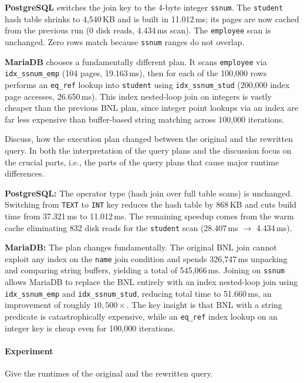 \documentclass[11pt]{scrartcl}
\begin{document}
\textbf{PostgreSQL} switches the join key to the 4-byte integer \texttt{ssnum}. The \texttt{student} hash table shrinks to 4,540\,KB and is built in 11.012\,ms; its pages are now cached from the previous run (0 disk reads, 4.434\,ms scan). The \texttt{employee} scan is unchanged. Zero rows match because \texttt{ssnum} ranges do not overlap.

\textbf{MariaDB} chooses a fundamentally different plan. It scans \texttt{employee} via \texttt{idx\_ssnum\_emp} (104 pages, 19.163\,ms), then for each of the 100,000 rows performs an \texttt{eq\_ref} lookup into \texttt{student} using \texttt{idx\_ssnum\_stud} (200,000 index page accesses, 26.650\,ms). This index nested-loop join on integers is vastly cheaper than the previous BNL plan, since integer point lookups via an index are far less expensive than buffer-based string matching across 100,000 iterations.

Discuss, how the execution plan changed between the original and the rewritten query. In both the interpretation of the query plans and the discussion focus on the crucial parts, i.e., the parts of the query plans that cause major runtime differences.

\textbf{PostgreSQL:} The operator type (hash join over full table scans) is unchanged. Switching from \texttt{TEXT} to \texttt{INT} key reduces the hash table by 868\,KB and cuts build time from 37.321\,ms to 11.012\,ms. The remaining speedup comes from the warm cache eliminating 832 disk reads for the \texttt{student} scan (28.407\,ms $\to$ 4.434\,ms).

\textbf{MariaDB:} The plan changes fundamentally. The original BNL join cannot exploit any index on the \texttt{name} join condition and spends 326,747\,ms unpacking and comparing string buffers, yielding a total of 545,066\,ms. Joining on \texttt{ssnum} allows MariaDB to replace the BNL entirely with an index nested-loop join using \texttt{idx\_ssnum\_emp} and \texttt{idx\_ssnum\_stud}, reducing total time to 51.660\,ms, an improvement of roughly $10{,}500\times$. The key insight is that BNL with a string predicate is catastrophically expensive, while an \texttt{eq\_ref} index lookup on an integer key is cheap even for 100,000 iterations.

\paragraph{Experiment}

Give the runtimes of the original and the rewritten query.
\end{document}
